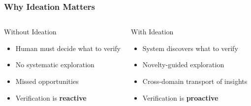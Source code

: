 \begin{frame}
\frametitle{Why Ideation Matters}
\begin{columns}[T]
\begin{alertblock}{Without Ideation}
  \begin{itemize}
    \item Human must decide what to verify
    \item No systematic exploration
    \item Missed opportunities
    \item Verification is \textbf{reactive}
  \end{itemize}
\end{alertblock}
\begin{exampleblock}{With Ideation}
  \begin{itemize}
    \item System discovers what to verify
    \item Novelty-guided exploration
    \item Cross-domain transport of insights
    \item Verification is \textbf{proactive}
  \end{itemize}
\end{exampleblock}
\end{columns}
\vfill
\begin{center}
\end{center}
\end{frame}

